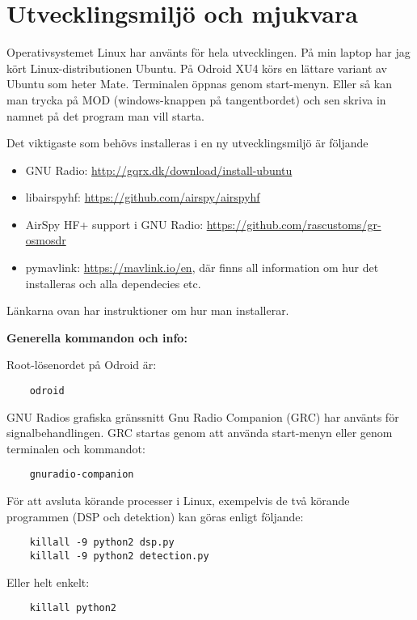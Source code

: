 \documentclass[11pt, a4paper]{report}
\begin{document}
\section*{Utvecklingsmiljö och mjukvara}
Operativsystemet  Linux har använts för hela utvecklingen. På min laptop har jag kört Linux-distributionen Ubuntu. På Odroid XU4 körs en lättare variant av Ubuntu som heter Mate. Terminalen öppnas genom start-menyn. Eller så kan man trycka på MOD (windows-knappen på tangentbordet) och sen skriva in namnet på det program man vill starta.

Det viktigaste som behövs installeras i en ny utvecklingsmiljö är följande
\begin{itemize}
    \item GNU Radio: \url{http://gqrx.dk/download/install-ubuntu}
    \item libairspyhf: \url{https://github.com/airspy/airspyhf}
    \item AirSpy HF+ support i GNU Radio: \url{https://github.com/rascustoms/gr-osmosdr}
    \item pymavlink: \url{https://mavlink.io/en}, där finns all information om hur det installeras och alla dependecies etc.
\end{itemize}
Länkarna ovan har instruktioner om hur man installerar.

\textbf{Generella kommandon och info:}

Root-lösenordet på Odroid är:
\begin{verbatim}
    odroid
\end{verbatim}
GNU Radios grafiska gränssnitt Gnu Radio Companion (GRC) har använts för signalbehandlingen. GRC startas genom att använda start-menyn eller genom terminalen och kommandot:
\begin{verbatim}
    gnuradio-companion
\end{verbatim}



För att avsluta körande processer i Linux, exempelvis de två körande programmen (DSP och detektion) kan göras enligt följande:
\begin{verbatim}
    killall -9 python2 dsp.py
    killall -9 python2 detection.py
\end{verbatim}

Eller helt enkelt:

\begin{verbatim}
    killall python2
\end{verbatim}
\end{document}
